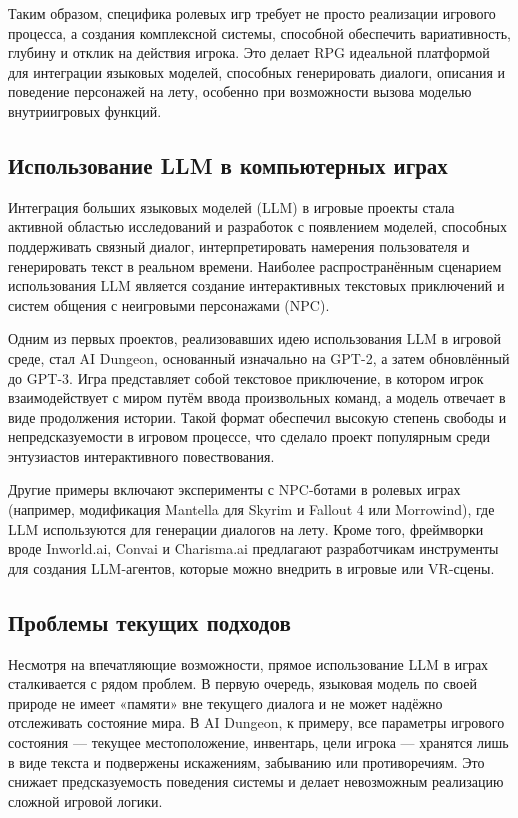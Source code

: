 \documentclass[14pt]{extarticle}
\begin{document}
Таким образом, специфика ролевых игр требует не просто реализации игрового процесса, а создания комплексной системы, способной обеспечить вариативность, глубину и отклик на действия игрока. Это делает RPG идеальной платформой для интеграции языковых моделей, способных генерировать диалоги, описания и поведение персонажей на лету, особенно при возможности вызова моделью внутриигровых функций.


\subsection{Использование LLM в компьютерных играх}

Интеграция больших языковых моделей (LLM) в игровые проекты стала активной областью исследований и разработок с появлением моделей, способных поддерживать связный диалог, интерпретировать намерения пользователя и генерировать текст в реальном времени. Наиболее распространённым сценарием использования LLM является создание интерактивных текстовых приключений и систем общения с неигровыми персонажами (NPC).

Одним из первых проектов, реализовавших идею использования LLM в игровой среде, стал AI Dungeon, основанный изначально на GPT-2, а затем обновлённый до GPT-3. Игра представляет собой текстовое приключение, в котором игрок взаимодействует с миром путём ввода произвольных команд, а модель отвечает в виде продолжения истории. Такой формат обеспечил высокую степень свободы и непредсказуемости в игровом процессе, что сделало проект популярным среди энтузиастов интерактивного повествования.

Другие примеры включают эксперименты с NPC-ботами в ролевых играх (например, модификация Mantella\cite{mantella} для Skyrim\cite{skyrim} и Fallout 4 или Morrowind\cite{morrowind}), где LLM используются для генерации диалогов на лету. Кроме того, фреймворки вроде Inworld.ai, Convai и Charisma.ai предлагают разработчикам инструменты для создания LLM-агентов, которые можно внедрить в игровые или VR-сцены.

\subsection{Проблемы текущих подходов}

Несмотря на впечатляющие возможности, прямое использование LLM в играх сталкивается с рядом проблем. В первую очередь, языковая модель по своей природе не имеет «памяти» вне текущего диалога и не может надёжно отслеживать состояние мира. В AI Dungeon, к примеру, все параметры игрового состояния --- текущее местоположение, инвентарь, цели игрока --- хранятся лишь в виде текста и подвержены искажениям, забыванию или противоречиям. Это снижает предсказуемость поведения системы и делает невозможным реализацию сложной игровой логики.
\end{document}
